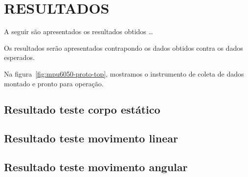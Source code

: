 \chapter{RESULTADOS}\label{chap:resuldatos}

A seguir são apresentados os resultados obtidos \ldots

Os resultados serão apresentados contrapondo os dados obtidos contra os dados esperados.

Na figura~\ref{fig:mpu6050-proto-top}, mostramos o instrumento de coleta de dados montado e pronto para operação.


\section{Resultado teste corpo estático}
\section{Resultado teste movimento linear}
\section{Resultado teste movimento angular}
